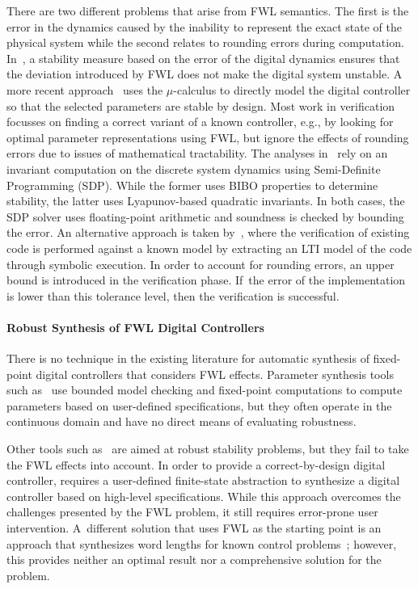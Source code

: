 \documentclass[final]{sig-alternate-05-2015}
\begin{document}
There are two different problems that arise from FWL semantics.  The first
is the error in the dynamics caused by the inability to represent the exact
state of the physical system while the second relates to rounding errors
during computation.  In~\cite{fialho1994stability}, a stability measure
based on the error of the digital dynamics ensures that the deviation
introduced by FWL does not make the digital system unstable.  A more recent
approach~\cite{DBLP:journals/automatica/WuLCC09} uses the $\mu$-calculus to
directly model the digital controller so that the selected parameters are
stable by design.  Most work in verification focusses on finding a correct
variant of a known controller, e.g., by looking for optimal parameter
representations using FWL, but ignore the effects of rounding errors due to
issues of mathematical tractability.  The analyses
in~\cite{DBLP:conf/hybrid/WangGRJF16, DBLP:conf/hybrid/RouxJG15} rely on an
invariant computation on the discrete system dynamics using Semi-Definite
Programming (SDP).  While the former uses BIBO properties to determine
stability, the latter uses Lyapunov-based quadratic invariants.  In both
cases, the SDP solver uses floating-point arithmetic and soundness is
checked by bounding the error.  An alternative approach is taken
by~\cite{park2016scalable}, where the verification of existing code is
performed against a known model by extracting an LTI model of the code
through symbolic execution.  In order to account for rounding errors, an
upper bound is introduced in the verification phase.  If~the error of the
implementation is lower than this tolerance level, then the verification is
successful.

\paragraph{Robust Synthesis of FWL Digital Controllers}

There is no technique in the existing literature for automatic synthesis of
fixed-point digital controllers that considers FWL effects.  Parameter
synthesis tools such as~\cite{cimatti2013parameter} use bounded model
checking and fixed-point computations to compute parameters based on
user-defined specifications, but they often operate in the continuous domain
and have no direct means of evaluating robustness.

Other tools such as~\cite{economakos2016automated} are aimed at
robust stability problems, but they fail to take the FWL effects into
account.  In order to provide a correct-by-design digital controller,
\cite{alur2016compositional} requires a user-defined finite-state
abstraction to synthesize a digital controller based on high-level
specifications.  While this approach overcomes the challenges presented by
the FWL problem, it still requires error-prone user intervention. 
A~different solution that uses FWL as the starting point is an approach that
synthesizes word lengths for known control problems~\cite{jha2013swati};
however, this provides neither an optimal result nor a comprehensive
solution for the problem.
\end{document}
